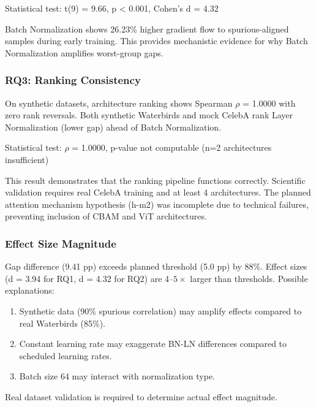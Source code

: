 Statistical test: t(9) = 9.66, p < 0.001, Cohen's d = 4.32

Batch Normalization shows 26.23\% higher gradient flow to spurious-aligned samples during early training. This provides mechanistic evidence for why Batch Normalization amplifies worst-group gaps.

\subsubsection{RQ3: Ranking Consistency}

On synthetic datasets, architecture ranking shows Spearman $\rho$ = 1.0000 with zero rank reversals. Both synthetic Waterbirds and mock CelebA rank Layer Normalization (lower gap) ahead of Batch Normalization.

\begin{table}[htbp]
\centering
{}
\end{table}

Statistical test: $\rho$ = 1.0000, p-value not computable (n=2 architectures insufficient)

This result demonstrates that the ranking pipeline functions correctly. Scientific validation requires real CelebA training and at least 4 architectures. The planned attention mechanism hypothesis (h-m2) was incomplete due to technical failures, preventing inclusion of CBAM and ViT architectures.

\subsubsection{Effect Size Magnitude}

Gap difference (9.41 pp) exceeds planned threshold (5.0 pp) by 88\%. Effect sizes (d = 3.94 for RQ1, d = 4.32 for RQ2) are 4--$5\times$ larger than thresholds. Possible explanations:

\begin{enumerate}
\item Synthetic data (90\% spurious correlation) may amplify effects compared to real Waterbirds (85\%).
\item Constant learning rate may exaggerate BN-LN differences compared to scheduled learning rates.
\item Batch size 64 may interact with normalization type.
\end{enumerate}

Real dataset validation is required to determine actual effect magnitude.
